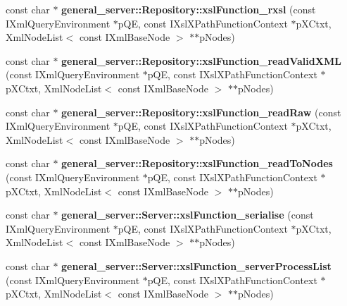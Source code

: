 \begin{DoxyCompactItemize}
\item 
\hypertarget{group__XSLModule-Functions_ga6fd492a595c2190d2cdcc15d73600678}{const char $\ast$ {\bfseries general\-\_\-server\-::\-Repository\-::xsl\-Function\-\_\-rxsl} (const \-I\-Xml\-Query\-Environment $\ast$p\-Q\-E, const \-I\-Xsl\-X\-Path\-Function\-Context $\ast$p\-X\-Ctxt, \-Xml\-Node\-List$<$ const \-I\-Xml\-Base\-Node $>$ $\ast$$\ast$p\-Nodes)}\label{group__XSLModule-Functions_ga6fd492a595c2190d2cdcc15d73600678}

\item 
\hypertarget{group__XSLModule-Functions_gaf94e10af29ce6c16f9edf8037bdca2f9}{const char $\ast$ {\bfseries general\-\_\-server\-::\-Repository\-::xsl\-Function\-\_\-read\-Valid\-X\-M\-L} (const \-I\-Xml\-Query\-Environment $\ast$p\-Q\-E, const \-I\-Xsl\-X\-Path\-Function\-Context $\ast$p\-X\-Ctxt, \-Xml\-Node\-List$<$ const \-I\-Xml\-Base\-Node $>$ $\ast$$\ast$p\-Nodes)}\label{group__XSLModule-Functions_gaf94e10af29ce6c16f9edf8037bdca2f9}

\item 
\hypertarget{group__XSLModule-Functions_ga02b0c10bfdb3cbe469a9b5838d6460e3}{const char $\ast$ {\bfseries general\-\_\-server\-::\-Repository\-::xsl\-Function\-\_\-read\-Raw} (const \-I\-Xml\-Query\-Environment $\ast$p\-Q\-E, const \-I\-Xsl\-X\-Path\-Function\-Context $\ast$p\-X\-Ctxt, \-Xml\-Node\-List$<$ const \-I\-Xml\-Base\-Node $>$ $\ast$$\ast$p\-Nodes)}\label{group__XSLModule-Functions_ga02b0c10bfdb3cbe469a9b5838d6460e3}

\item 
\hypertarget{group__XSLModule-Functions_gab3913f2a4a226b2569fefe7cb8309639}{const char $\ast$ {\bfseries general\-\_\-server\-::\-Repository\-::xsl\-Function\-\_\-read\-To\-Nodes} (const \-I\-Xml\-Query\-Environment $\ast$p\-Q\-E, const \-I\-Xsl\-X\-Path\-Function\-Context $\ast$p\-X\-Ctxt, \-Xml\-Node\-List$<$ const \-I\-Xml\-Base\-Node $>$ $\ast$$\ast$p\-Nodes)}\label{group__XSLModule-Functions_gab3913f2a4a226b2569fefe7cb8309639}

\item 
\hypertarget{group__XSLModule-Functions_gae01c3067eedeb6bebf7c5eee92563ccb}{const char $\ast$ {\bfseries general\-\_\-server\-::\-Server\-::xsl\-Function\-\_\-serialise} (const \-I\-Xml\-Query\-Environment $\ast$p\-Q\-E, const \-I\-Xsl\-X\-Path\-Function\-Context $\ast$p\-X\-Ctxt, \-Xml\-Node\-List$<$ const \-I\-Xml\-Base\-Node $>$ $\ast$$\ast$p\-Nodes)}\label{group__XSLModule-Functions_gae01c3067eedeb6bebf7c5eee92563ccb}

\item 
\hypertarget{group__XSLModule-Functions_ga86abca68abb2fc5c924f6c3b574bc89d}{const char $\ast$ {\bfseries general\-\_\-server\-::\-Server\-::xsl\-Function\-\_\-server\-Process\-List} (const \-I\-Xml\-Query\-Environment $\ast$p\-Q\-E, const \-I\-Xsl\-X\-Path\-Function\-Context $\ast$p\-X\-Ctxt, \-Xml\-Node\-List$<$ const \-I\-Xml\-Base\-Node $>$ $\ast$$\ast$p\-Nodes)}\label{group__XSLModule-Functions_ga86abca68abb2fc5c924f6c3b574bc89d}


\end{DoxyCompactItemize}
